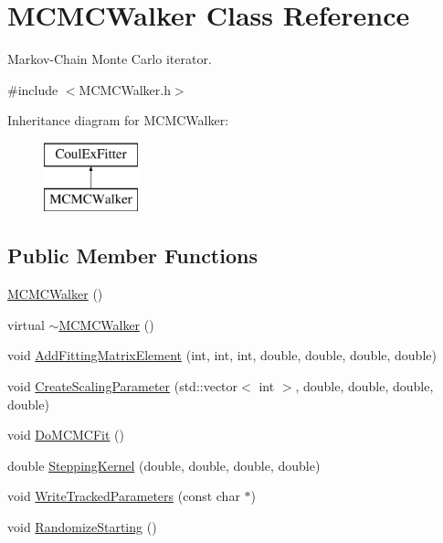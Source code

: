 \hypertarget{classMCMCWalker}{\section{M\-C\-M\-C\-Walker Class Reference}
\label{classMCMCWalker}
}


Markov-\/\-Chain Monte Carlo iterator.  




{\ttfamily \#include $<$M\-C\-M\-C\-Walker.\-h$>$}

Inheritance diagram for M\-C\-M\-C\-Walker\-:\begin{figure}[H]
\begin{center}
\leavevmode
\includegraphics[height=2.000000cm]{classMCMCWalker}
\end{center}
\end{figure}
\subsection*{Public Member Functions}
\begin{DoxyCompactItemize}
\item 
\hyperlink{classMCMCWalker_accc107b974667b36797f3d66e59c191e}{M\-C\-M\-C\-Walker} ()
\item 
virtual \hyperlink{classMCMCWalker_a9e7c2ab3ad45e714c5ec1981fd628d62}{$\sim$\-M\-C\-M\-C\-Walker} ()
\item 
void \hyperlink{classMCMCWalker_a8890a051f7886b15e4e74dfeb7d49369}{Add\-Fitting\-Matrix\-Element} (int, int, int, double, double, double, double)
\item 
void \hyperlink{classMCMCWalker_aad4526c93ec92271d749c0ede942513b}{Create\-Scaling\-Parameter} (std\-::vector$<$ int $>$, double, double, double, double)
\item 
void \hyperlink{classMCMCWalker_a39f6b9668e471ae8bfbf884db39ee48f}{Do\-M\-C\-M\-C\-Fit} ()
\item 
double \hyperlink{classMCMCWalker_ac2cbcfb38c9ef809abeecae53b805968}{Stepping\-Kernel} (double, double, double, double)
\item 
void \hyperlink{classMCMCWalker_aeeefa3cecc1578a8342f130df75f8e7a}{Write\-Tracked\-Parameters} (const char $\ast$)
\item 
void \hyperlink{classMCMCWalker_a9d71c0b83fab055912e71d8dcb33bc54}{Randomize\-Starting} ()
\end{DoxyCompactItemize}


